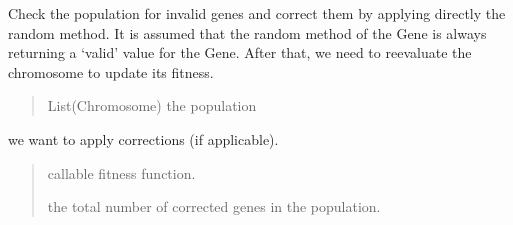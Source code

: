 \documentclass[letterpaper,10pt,english]{sphinxmanual}
\begin{document}

\begin{fulllineitems}
\label{\detokenize{pygenalgo.engines:pygenalgo.engines.auxiliary.apply_corrections}}
\pysigstartsignatures
{}
\pysigstopsignatures
\sphinxAtStartPar
Check the population  for invalid genes and correct them by applying directly
the random method. It is assumed that the random method of the Gene is always
returning a ‘valid’ value for the Gene. After that, we need to reevaluate the
chromosome to update its fitness.
\begin{quote}\begin{description}
\sphinxAtStartPar
{} \textendash{} List(Chromosome) the population

\end{description}\end{quote}

\sphinxAtStartPar
we want to apply corrections (if applicable).
\begin{quote}\begin{description}
\sphinxAtStartPar
{} \textendash{} callable fitness function.

\sphinxAtStartPar
the total number of corrected genes in the population.

\end{description}\end{quote}

\end{fulllineitems}

\end{document}

